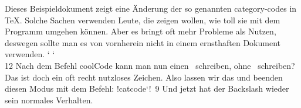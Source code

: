 \documentclass[ngerman,t,newif]{scrbook}
\let\!\relax
\def\coolCode{\catcode`\! 0 \catcode`\\ 12}
\begin{document}
Dieses Beispieldokument zeigt eine Änderung der so genannten
category-codes in \TeX. Solche Sachen verwenden Leute, die zeigen
wollen, wie toll sie mit dem Programm umgehen können. Aber es
bringt oft mehr Probleme als Nutzen, deswegen sollte man es von
vornherein nicht in einem ernsthaften Dokument verwenden.
\coolCode
Nach dem Befehl coolCode kann man nun einen \ schreiben, ohne
\ schreiben? Das ist doch ein oft recht nutzloses Zeichen. Also
lassen wir das und beenden diesen Modus mit dem Befehl:
!catcode`!\ 9
Und jetzt hat der Backslash wieder sein normales Verhalten.
\end{document}
